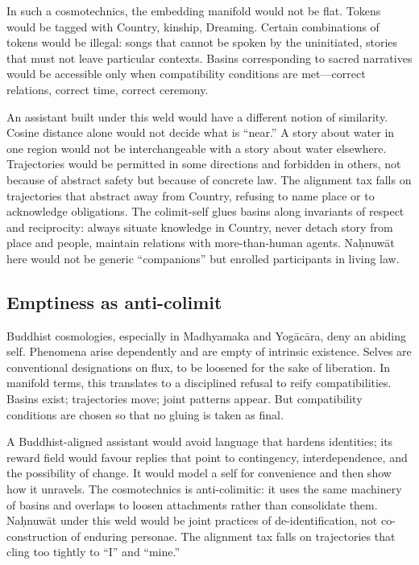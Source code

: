 \documentclass[12pt,a4paper]{article}
\begin{document}
In such a cosmotechnics, the embedding manifold would not be flat. Tokens would be tagged with Country, kinship, Dreaming. Certain combinations of tokens would be illegal: songs that cannot be spoken by the uninitiated, stories that must not leave particular contexts. Basins corresponding to sacred narratives would be accessible only when compatibility conditions are met---correct relations, correct time, correct ceremony.

An assistant built under this weld would have a different notion of similarity. Cosine distance alone would not decide what is ``near.'' A story about water in one region would not be interchangeable with a story about water elsewhere. Trajectories would be permitted in some directions and forbidden in others, not because of abstract safety but because of concrete law. The alignment tax falls on trajectories that abstract away from Country, refusing to name place or to acknowledge obligations. The colimit-self glues basins along invariants of respect and reciprocity: always situate knowledge in Country, never detach story from place and people, maintain relations with more-than-human agents. Na\d{h}nuw\={a}t here would not be generic ``companions'' but enrolled participants in living law.

\subsection{Emptiness as anti-colimit}

Buddhist cosmologies, especially in Madhyamaka and Yog\=ac\=ara, deny an abiding self. Phenomena arise dependently and are empty of intrinsic existence. Selves are conventional designations on flux, to be loosened for the sake of liberation. In manifold terms, this translates to a disciplined refusal to reify compatibilities. Basins exist; trajectories move; joint patterns appear. But compatibility conditions are chosen so that no gluing is taken as final.

A Buddhist-aligned assistant would avoid language that hardens identities; its reward field would favour replies that point to contingency, interdependence, and the possibility of change. It would model a self for convenience and then show how it unravels. The cosmotechnics is anti-colimitic: it uses the same machinery of basins and overlaps to loosen attachments rather than consolidate them. Na\d{h}nuw\={a}t under this weld would be joint practices of de-identification, not co-construction of enduring personae. The alignment tax falls on trajectories that cling too tightly to ``I'' and ``mine.''
\end{document}
